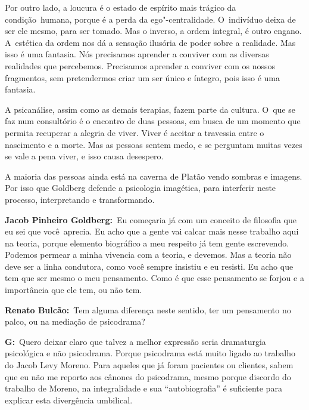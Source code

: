 Por outro lado, a loucura é o estado de espírito mais trágico da
condição\textbf{}~humana, porque é a perda da ego"-centralidade. O~indivíduo deixa de ser ele mesmo, para ser tomado. Mas o inverso, a
ordem integral, é outro engano. A~estética da ordem nos dá a sensação
ilusória de poder sobre a realidade. Mas isso é uma fantasia. Nós
precisamos aprender a conviver com as diversas realidades que
percebemos. Precisamos aprender a conviver com os nossos fragmentos, sem
pretendermos criar um ser único e íntegro, pois isso é uma fantasia.

A psicanálise, assim como as demais terapias, fazem parte da cultura. O~que se faz num consultório é o encontro de duas pessoas, em busca de um
momento que permita recuperar a alegria de viver. Viver é aceitar a
travessia entre o nascimento e a morte. Mas as pessoas sentem medo, e se
perguntam muitas vezes se vale a pena viver, e isso causa desespero.

A maioria das pessoas ainda está na caverna de Platão vendo sombras e
imagens. Por isso que Goldberg defende a psicologia imagética, para
interferir neste processo, interpretando e transformando.

\begin{center}\asterisc{}\end{center}

\abrefala

\textbf{Jacob Pinheiro Goldberg:}~Eu começaria já com um conceito de
filosofia que eu sei que você\textbf{}~aprecia. Eu acho que a gente vai
calcar mais nesse trabalho aqui na teoria, porque elemento biográfico a
meu respeito já tem gente escrevendo. Podemos permear a minha vivencia
com a teoria, e devemos. Mas a teoria não deve ser a linha condutora,
como você sempre insistiu e eu resisti. Eu acho que tem que ser mesmo o
meu pensamento. Como é que esse pensamento se forjou e a importância que
ele tem, ou não tem.

 

\textbf{Renato Bulcão:}~Tem alguma diferença neste sentido, ter um
pensamento no palco, ou na mediação de psicodrama?

 

\textbf{G:}~Quero deixar claro que talvez a melhor expressão seria
dramaturgia psicológica e não psicodrama. Porque psicodrama está muito
ligado ao trabalho do Jacob Levy Moreno. Para aqueles que já foram
pacientes ou clientes, sabem que eu não me reporto aos cânones do
psicodrama, mesmo porque discordo do trabalho de Moreno, na
integralidade e sua ``autobiografia'' é suficiente para explicar esta
divergência umbilical.


